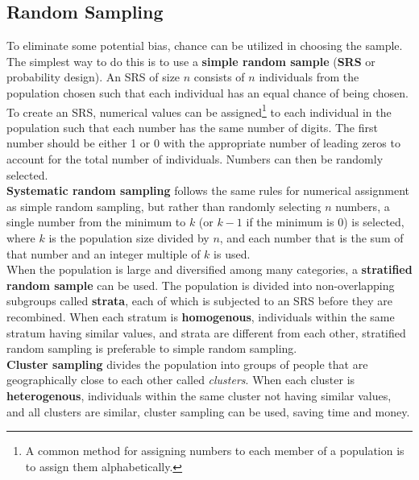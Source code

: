 \documentclass[../AP_Statistics.tex]{subfiles}
\begin{document}
		\subsection*{Random Sampling}
			To eliminate some potential bias, chance can be utilized in choosing the sample. The simplest way to do this is to use a \textbf{simple random sample} (\textbf{SRS} or probability design). An SRS of size $n$ consists of $n$ individuals from the population chosen such that each individual has an equal chance of being chosen. \\
			To create an SRS, numerical values can be assigned\footnote{A common method for assigning numbers to each member of a population is to assign them alphabetically.} to each individual in the population such that each number has the same number of digits. The first number should be either 1 or 0 with the appropriate number of leading zeros to account for the total number of individuals. Numbers can then be randomly selected. \\
			\textbf{Systematic random sampling} follows the same rules for numerical assignment as simple random sampling, but rather than randomly selecting $n$ numbers, a single number from the minimum to $k$ (or $k - 1$ if the minimum is 0) is selected, where $k$ is the population size divided by $n$, and each number that is the sum of that number and an integer multiple of $k$ is used. \\
			When the population is large and diversified among many categories, a \textbf{stratified random sample} can be used. The population is divided into non-overlapping subgroups called \textbf{strata}, each of which is subjected to an SRS before they are recombined. When each stratum is \textbf{homogenous}, individuals within the same stratum having similar values, and strata are different from each other, stratified random sampling is preferable to simple random sampling. \\
			\textbf{Cluster sampling} divides the population into groups of people that are geographically close to each other called \emph{clusters}. When each cluster is \textbf{heterogenous}, individuals within the same cluster not having similar values, and all clusters are similar, cluster sampling can be used, saving time and money. \\
\end{document}
